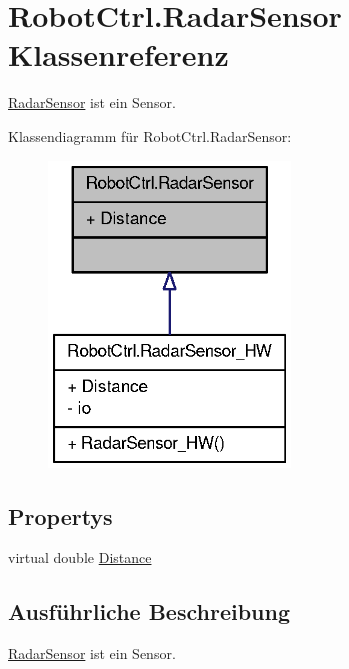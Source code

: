 \hypertarget{class_robot_ctrl_1_1_radar_sensor}{
\section{RobotCtrl.RadarSensor Klassenreferenz}
\label{class_robot_ctrl_1_1_radar_sensor}
}


\hyperlink{class_robot_ctrl_1_1_radar_sensor}{RadarSensor} ist ein Sensor.  




Klassendiagramm für RobotCtrl.RadarSensor:\nopagebreak
\begin{figure}[H]
\begin{center}
\leavevmode
\includegraphics[width=182pt]{class_robot_ctrl_1_1_radar_sensor__inherit__graph}
\end{center}
\end{figure}
\subsection*{Propertys}
\begin{DoxyCompactItemize}
\item 
virtual double \hyperlink{class_robot_ctrl_1_1_radar_sensor_a1be5541f3153ba40736f7a9fa292375b}{Distance}
\end{DoxyCompactItemize}


\subsection{Ausführliche Beschreibung}
\hyperlink{class_robot_ctrl_1_1_radar_sensor}{RadarSensor} ist ein Sensor. 

